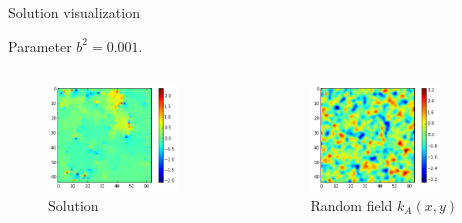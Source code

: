 \documentclass[12pt]{beamer}
\begin{document}
\begin{frame}{Solution visualization}

\begin{center}
Parameter $b^2 = 0.001$.
\end{center}

\begin{columns}
\begin{figure}[!ht]
\centering
\includegraphics[width=0.8\textwidth]{sol1e-3.png}
\caption{Solution}
\end{figure}

\begin{figure}[!ht]
\centering
\includegraphics[width=0.8\textwidth]{rand_field1e-3.png}
\caption{Random field $k_A(x, y)$}
\end{figure}

\end{columns}

\end{frame}
\end{document}
